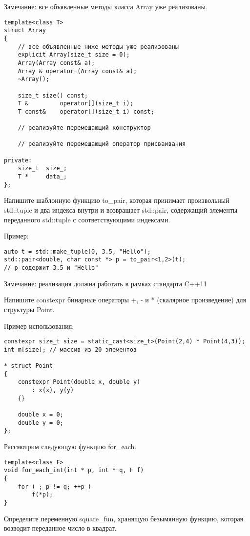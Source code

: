 \documentclass[]{article}
\begin{document}
Замечание: все объявленные методы класса Array уже реализованы.
\begin{verbatim}
template<class T>
struct Array
{
    // все объявленные ниже методы уже реализованы
    explicit Array(size_t size = 0);
    Array(Array const& a);
    Array & operator=(Array const& a);
    ~Array();

    size_t size() const;
    T &         operator[](size_t i);
    T const&    operator[](size_t i) const;

    // реализуйте перемещающий конструктор

    // реализуйте перемещающий оператор присваивания

private:    
    size_t  size_;
    T *     data_;    
};

\end{verbatim}
Напишите шаблонную функцию to\_pair, которая принимает произвольный std::tuple и два индекса внутри и возвращает std::pair, содержащий элементы переданного std::tuple с соответствующими индексами.

Пример:
\begin{verbatim}
auto t = std::make_tuple(0, 3.5, "Hello");
std::pair<double, char const *> p = to_pair<1,2>(t); 
// p содержит 3.5 и "Hello"
\end{verbatim}

Замечание: реализация должна работать в рамках стандарта C++11

Напишите constexpr бинарные операторы +, - и * (скалярное произведение) для структуры Point.

Пример использования:
\begin{verbatim}
constexpr size_t size = static_cast<size_t>(Point(2,4) * Point(4,3));
int m[size]; // массив из 20 элементов

* struct Point
{
    constexpr Point(double x, double y) 
        : x(x), y(y) 
    {}

    double x = 0;
    double y = 0;
};

\end{verbatim}

Рассмотрим следующую функцию for\_each.
\begin{verbatim}
template<class F>
void for_each_int(int * p, int * q, F f)
{
    for ( ; p != q; ++p )
        f(*p);
}
\end{verbatim}
Определите переменную square\_fun, хранящую безымянную функцию, которая возводит переданное число в квадрат.
\end{document}
